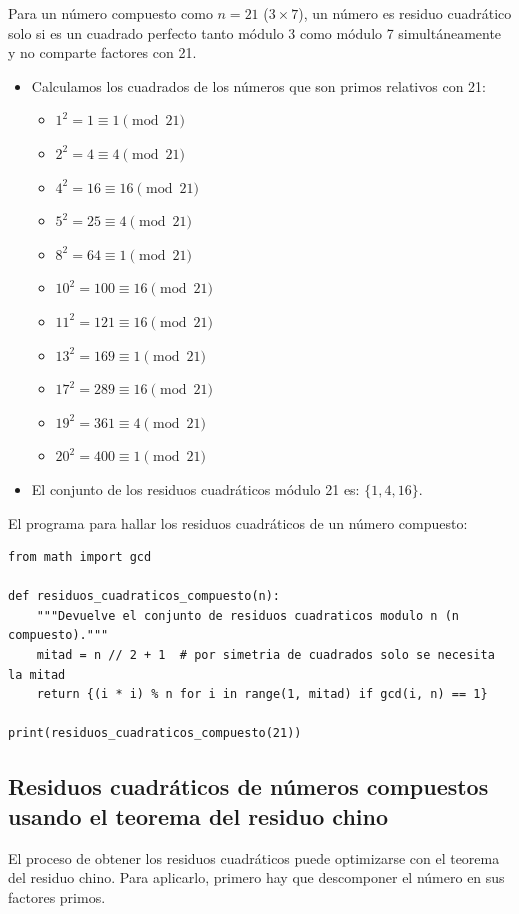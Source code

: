 \begin{ejemplo}
\end{ejemplo}
\begin{solucion}
Para un número compuesto como $n = 21$ ($3 \times 7$), un número es residuo cuadrático solo si es un cuadrado perfecto tanto módulo 3 como módulo 7 simultáneamente y no comparte factores con 21.
\begin{itemize}
	\item Calculamos los cuadrados de los números que son primos relativos con 21:
	\begin{itemize}
	\item $1^2 = 1 \equiv 1 \pmod{21}$
	\item $2^2 = 4 \equiv 4 \pmod{21}$
	\item $4^2 = 16 \equiv 16 \pmod{21}$
	\item $5^2 = 25 \equiv 4 \pmod{21}$
	\item $8^2 = 64 \equiv 1 \pmod{21}$
	\item $10^2 = 100 \equiv 16 \pmod{21}$
	\item $11^2 = 121 \equiv 16 \pmod{21}$
	\item $13^2 = 169 \equiv 1 \pmod{21}$
	\item $17^2 = 289 \equiv 16 \pmod{21}$
	\item $19^2 = 361 \equiv 4 \pmod{21}$
	\item $20^2 = 400 \equiv 1 \pmod{21}$
	\end{itemize}
    \item El conjunto de los residuos cuadráticos módulo 21 es: $\{1, 4, 16\}$.
\end{itemize}
El programa para hallar los residuos cuadráticos de un número compuesto:
\begin{verbatim}
from math import gcd

def residuos_cuadraticos_compuesto(n):
    """Devuelve el conjunto de residuos cuadraticos modulo n (n compuesto)."""
    mitad = n // 2 + 1  # por simetria de cuadrados solo se necesita la mitad
    return {(i * i) % n for i in range(1, mitad) if gcd(i, n) == 1}

print(residuos_cuadraticos_compuesto(21))
\end{verbatim}
\end{solucion}

\subsection{Residuos cuadráticos de números compuestos usando el teorema del residuo chino}
El proceso de obtener los residuos cuadráticos puede optimizarse con el teorema del residuo chino. Para aplicarlo, primero hay que descomponer el número en sus factores primos.


